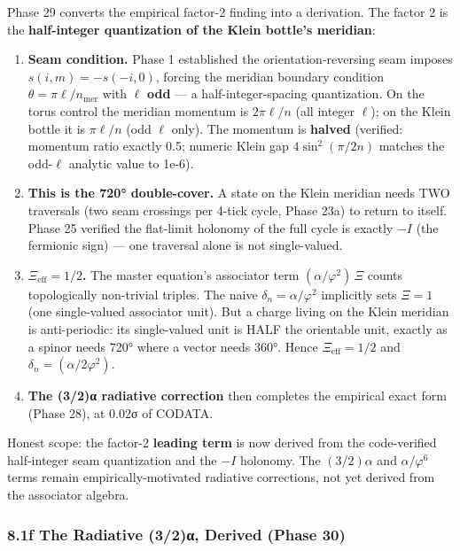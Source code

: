 \documentclass[
]{article}
\providecommand{\tightlist}{%
  \setlength{\itemsep}{0pt}\setlength{\parskip}{0pt}}
\begin{document}
Phase 29 converts the empirical factor-2 finding into a derivation. The
factor 2 is the \textbf{half-integer quantization of the Klein bottle's
meridian}:

\begin{enumerate}
\def\labelenumi{\arabic{enumi}.}
\tightlist
\item
  \textbf{Seam condition.} Phase 1 established the orientation-reversing
  seam imposes \(s(i,m) = -s(-i,0)\), forcing the meridian boundary
  condition \(\theta = \pi\ell/n_{\text{mer}}\) with \(\ell\)
  \textbf{odd} --- a half-integer-spacing quantization. On the torus
  control the meridian momentum is \(2\pi\ell/n\) (all integer
  \(\ell\)); on the Klein bottle it is \(\pi\ell/n\) (odd \(\ell\)
  only). The momentum is \textbf{halved} (verified: momentum ratio
  exactly 0.5; numeric Klein gap \(4\sin^2(\pi/2n)\) matches the
  odd-\(\ell\) analytic value to 1e-6).
\item
  \textbf{This is the 720° double-cover.} A state on the Klein meridian
  needs TWO traversals (two seam crossings per 4-tick cycle, Phase 23a)
  to return to itself. Phase 25 verified the flat-limit holonomy of the
  full cycle is exactly \(-I\) (the fermionic sign) --- one traversal
  alone is not single-valued.
\item
  \textbf{\(\Xi_{\text{eff}} = 1/2\).} The master equation's associator
  term \((\alpha/\varphi^2)\,\Xi\) counts topologically non-trivial
  triples. The naive \(\delta_n = \alpha/\varphi^2\) implicitly sets
  \(\Xi = 1\) (one single-valued associator unit). But a charge living
  on the Klein meridian is anti-periodic: its single-valued unit is HALF
  the orientable unit, exactly as a spinor needs 720° where a vector
  needs 360°. Hence \(\Xi_{\text{eff}} = 1/2\) and
  \(\delta_n = (\alpha/2\varphi^2)\).
\item
  \textbf{The (3/2)α radiative correction} then completes the empirical
  exact form (Phase 28), at 0.02σ of CODATA.
\end{enumerate}

Honest scope: the factor-2 \textbf{leading term} is now derived from the
code-verified half-integer seam quantization and the \(-I\) holonomy.
The \((3/2)\alpha\) and \(\alpha/\varphi^6\) terms remain
empirically-motivated radiative corrections, not yet derived from the
associator algebra.

\subsubsection{8.1f The Radiative (3/2)α, Derived (Phase
30)}\label{f-the-radiative-32ux3b1-derived-phase-30}
\end{document}
